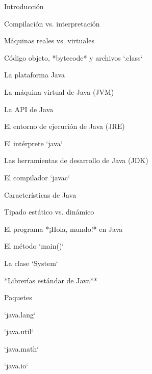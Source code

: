 \begin{longenum}
    \begin{longenum}
        \item Introducción
        \item Compilación vs. interpretación
        \begin{longenum}
            \item Máquinas reales vs. virtuales
            \item Código objeto, *bytecode* y archivos `.class`
            \item La plataforma Java
            \begin{longenum}
                \item La máquina virtual de Java (JVM)
                \item La API de Java
            \end{longenum}
            \item El entorno de ejecución de Java (JRE)
            \begin{longenum}
                \item El intérprete `java`
            \end{longenum}
            \item Las herramientas de desarrollo de Java (JDK)
            \begin{longenum}
                \item El compilador `javac`
            \end{longenum}
        \end{longenum}
        \item Características de Java
        \item Tipado estático vs. dinámico
        \item El programa *¡Hola, mundo!* en Java
        \begin{longenum}
            \item El método `main()`
            \item La clase `System`
        \end{longenum}
    \end{longenum}
    \item **Librerías estándar de Java**
    \begin{longenum}
        \item Paquetes
        \item `java.lang`
        \item `java.util`
        \item `java.math`
        \item `java.io`
    \end{longenum}
\end{longenum}
